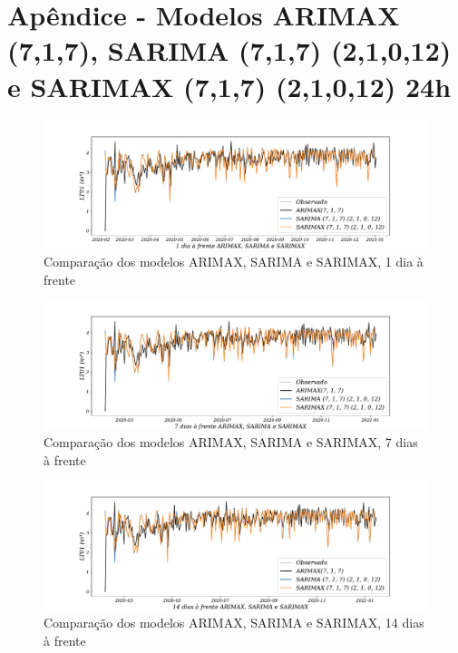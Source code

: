 
\section{Ap\^endice - Modelos ARIMAX (7,1,7), SARIMA (7,1,7) (2,1,0,12) e SARIMAX (7,1,7) (2,1,0,12) 24h}\label{sec:arimaxsarimasarimax24}

\begin{figure}[H]
	\centering
	\caption{Comparação dos modelos ARIMAX, SARIMA e SARIMAX, 1 dia à frente }
	\label{fig:1-ARIMAX-SARIMA-SARIMAX24}
	\includegraphics[width=1\linewidth]{Apendices/Figuras/modelagem-24h/1-ARIMAX-SARIMA-SARIMAX}
	
\end{figure}

\begin{figure}[!htpb]
	\centering
	\caption{Comparação dos modelos ARIMAX, SARIMA e SARIMAX, 7 dias à frente }
	\label{fig:10-ARIMAX-SARIMA-SARIMAX24}
	\includegraphics[width=1\linewidth]{Apendices/Figuras/modelagem-24h/7-ARIMAX-SARIMA-SARIMAX}
	
\end{figure}


\begin{figure}[!htpb]
	\centering
	\caption{Comparação dos modelos ARIMAX, SARIMA e SARIMAX, 14 dias à frente }
	\label{fig:30-ARIMAX-SARIMA-SARIMAX24}
	\includegraphics[width=1\linewidth]{Apendices/Figuras/modelagem-24h/14-ARIMAX-SARIMA-SARIMAX}
	
\end{figure}

